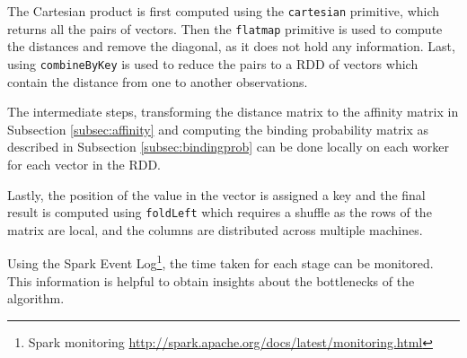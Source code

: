 The Cartesian product is first computed using the \texttt{cartesian} primitive, which returns all the pairs of vectors. Then the \texttt{flatmap} primitive is used to compute the distances and remove the diagonal, as it does not hold any information. Last, using \texttt{combineByKey} is used to reduce the pairs to a RDD of vectors which contain the distance from one to another observations.

The intermediate steps, transforming the distance matrix to the affinity matrix in Subsection \ref{subsec:affinity} and computing the binding probability matrix as described in Subsection \ref{subsec:bindingprob} can be done locally on each worker for each vector in the RDD.

Lastly, the position of the value in the vector is assigned a key and the final result is computed using \texttt{foldLeft} which requires a shuffle as the rows of the matrix are local, and the columns are distributed across multiple machines.

Using the Spark Event Log\footnote{Spark monitoring \url{http://spark.apache.org/docs/latest/monitoring.html}}, the time taken for each stage can be monitored. This information is helpful to obtain insights about the bottlenecks of the algorithm.

